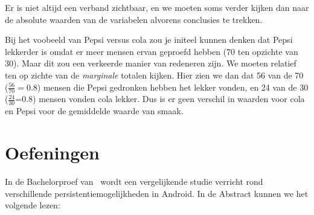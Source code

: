 Er is niet altijd een verband zichtbaar, en we moeten soms verder kijken dan naar de absolute waarden van de variabelen alvorens conclusies te trekken.

\begin{example}
	Bij het voobeeld van Pepsi versus cola zou je initeel kunnen denken dat Pepsi lekkerder is omdat er meer mensen ervan geproefd hebben (70 ten opzichte van 30). Maar dit zou een verkeerde manier van redeneren zijn. We moeten relatief ten op zichte van de  \textit{marginale} totalen kijken. Hier zien we dan dat 56 van de 70 ($\frac{56}{70} = 0.8$) mensen die Pepsi gedronken hebben het lekker vonden, en 24 van de 30 ($\frac{24}{30}$=0.8) mensen vonden cola lekker. Dus is er geen verschil in waarden voor cola en Pepsi voor de gemiddelde waarde van smaak.
\end{example}

\section{Oefeningen}
\label{sec:proces-oefeningen}


In de Bachelorproef van~\textcite{Akin2016} wordt een vergelijkende studie verricht rond verschillende persistentiemogelijkheden in Android. In de Abstract kunnen we het volgende lezen:

